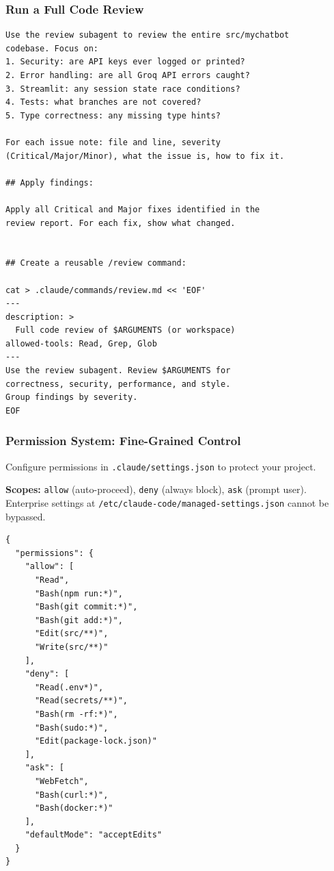 \begin{frame}[fragile]\frametitle{Run a Full Code Review}
\begin{lstlisting}
Use the review subagent to review the entire src/mychatbot
codebase. Focus on:
1. Security: are API keys ever logged or printed?
2. Error handling: are all Groq API errors caught?
3. Streamlit: any session state race conditions?
4. Tests: what branches are not covered?
5. Type correctness: any missing type hints?

For each issue note: file and line, severity
(Critical/Major/Minor), what the issue is, how to fix it.

## Apply findings:

Apply all Critical and Major fixes identified in the
review report. For each fix, show what changed.


## Create a reusable /review command:

cat > .claude/commands/review.md << 'EOF'
---
description: >
  Full code review of $ARGUMENTS (or workspace)
allowed-tools: Read, Grep, Glob
---
Use the review subagent. Review $ARGUMENTS for
correctness, security, performance, and style.
Group findings by severity.
EOF
\end{lstlisting}
\end{frame}


\begin{frame}[fragile]\frametitle{Permission System: Fine-Grained Control}
Configure permissions in \texttt{.claude/settings.json} to protect your project.

\textbf{Scopes:} \texttt{allow} (auto-proceed), \texttt{deny} (always block), \texttt{ask} (prompt user). Enterprise settings at \texttt{/etc/claude-code/managed-settings.json} cannot be bypassed.


\begin{lstlisting}
{
  "permissions": {
    "allow": [
      "Read",
      "Bash(npm run:*)",
      "Bash(git commit:*)",
      "Bash(git add:*)",
      "Edit(src/**)",
      "Write(src/**)"
    ],
    "deny": [
      "Read(.env*)",
      "Read(secrets/**)",
      "Bash(rm -rf:*)",
      "Bash(sudo:*)",
      "Edit(package-lock.json)"
    ],
    "ask": [
      "WebFetch",
      "Bash(curl:*)",
      "Bash(docker:*)"
    ],
    "defaultMode": "acceptEdits"
  }
}
\end{lstlisting}

\end{frame}


